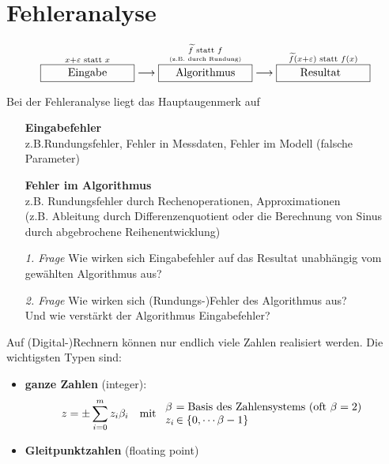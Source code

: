 % 
% 
% 
% 


\chapter{Fehleranalyse} \label{3}
\begin{align*}
  \overset{
  x+\varepsilon \text{ statt } x}%
  {\framebox[3cm]{Eingabe}
  } 
  \longrightarrow 
  \overset{
  \underset{\text{\tiny (z.B. durch Rundung)}}{\widetilde{f} \text{ statt } f}}%
  {\framebox[3cm]{Algorithmus}
  } 
  \longrightarrow
  \overset{
  \widetilde{f}(x+\varepsilon) \text{ statt } f(x)}%
  {\framebox[3cm]{Resultat\phantom{g}}
  }
\end{align*}

Bei der Fehleranalyse liegt das Hauptaugenmerk auf
\begin{itemize}
\item[] \textbf{Eingabefehler}\\ z.B.Rundungsfehler, Fehler in Messdaten, Fehler im Modell (falsche Parameter)
\item[] \textbf{Fehler im Algorithmus} \\ z.B. Rundungsfehler durch Rechenoperationen, Approximationen \\
  (z.B. Ableitung durch Differenzenquotient oder die Berechnung von Sinus durch abgebrochene Reihenentwicklung)

\item[\textit{1. Frage}] Wie wirken sich Eingabefehler auf das Resultat unabhängig vom gewählten Algorithmus aus?
\item[\textit{2. Frage}]Wie wirken sich (Rundungs-)Fehler des Algorithmus aus?\\
  Und wie verstärkt der Algorithmus Eingabefehler?
\end{itemize}


 \label{3.1}  
Auf (Digital-)Rechnern können nur endlich viele Zahlen realisiert werden.
Die wichtigsten Typen sind: 
\begin{itemize}
\item \textbf{ganze Zahlen}  (integer):
  \begin{align*}
    z&=\pm \sum_{i=0}^{m}z_i\beta_i 
    & \text{mit }
      \begin{array}{l@{\,}l}
        \beta &= \text{Basis des Zahlensystems (oft $\beta=2$)} \\
        z_i &\in \{0, \cdots \beta-1\}
      \end{array}
  \end{align*}
\item \textbf{Gleitpunktzahlen} (floating point) 
\end{itemize}

